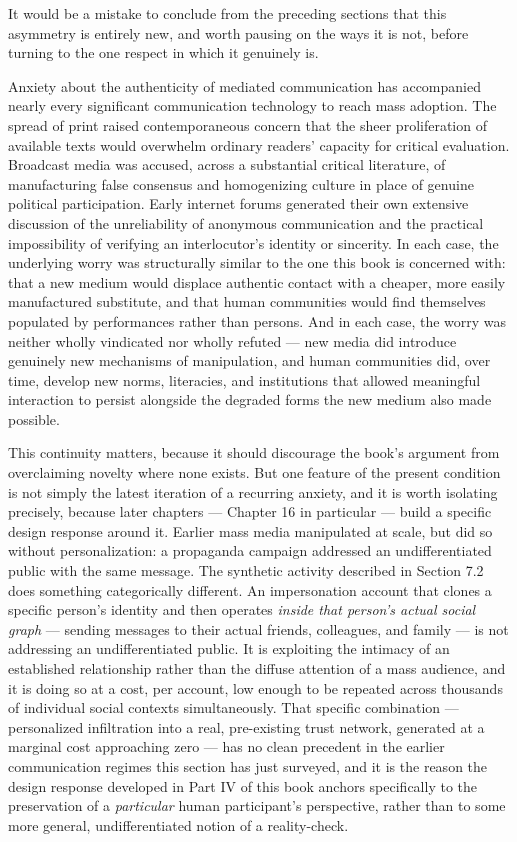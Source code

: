 \documentclass[12pt,a4paper]{book}
\begin{document}
It would be a mistake to conclude from the preceding sections that this asymmetry is entirely new, and worth pausing on the ways it is not, before turning to the one respect in which it genuinely is.

Anxiety about the authenticity of mediated communication has accompanied nearly every significant communication technology to reach mass adoption. The spread of print raised contemporaneous concern that the sheer proliferation of available texts would overwhelm ordinary readers' capacity for critical evaluation. Broadcast media was accused, across a substantial critical literature, of manufacturing false consensus and homogenizing culture in place of genuine political participation. Early internet forums generated their own extensive discussion of the unreliability of anonymous communication and the practical impossibility of verifying an interlocutor's identity or sincerity. In each case, the underlying worry was structurally similar to the one this book is concerned with: that a new medium would displace authentic contact with a cheaper, more easily manufactured substitute, and that human communities would find themselves populated by performances rather than persons. And in each case, the worry was neither wholly vindicated nor wholly refuted — new media did introduce genuinely new mechanisms of manipulation, and human communities did, over time, develop new norms, literacies, and institutions that allowed meaningful interaction to persist alongside the degraded forms the new medium also made possible.

This continuity matters, because it should discourage the book's argument from overclaiming novelty where none exists. But one feature of the present condition is not simply the latest iteration of a recurring anxiety, and it is worth isolating precisely, because later chapters — Chapter 16 in particular — build a specific design response around it. Earlier mass media manipulated at scale, but did so without personalization: a propaganda campaign addressed an undifferentiated public with the same message. The synthetic activity described in Section 7.2 does something categorically different. An impersonation account that clones a specific person's identity and then operates \emph{inside that person's actual social graph} — sending messages to their actual friends, colleagues, and family — is not addressing an undifferentiated public. It is exploiting the intimacy of an established relationship rather than the diffuse attention of a mass audience, and it is doing so at a cost, per account, low enough to be repeated across thousands of individual social contexts simultaneously. That specific combination — personalized infiltration into a real, pre-existing trust network, generated at a marginal cost approaching zero — has no clean precedent in the earlier communication regimes this section has just surveyed, and it is the reason the design response developed in Part IV of this book anchors specifically to the preservation of a \emph{particular} human participant's perspective, rather than to some more general, undifferentiated notion of a reality-check.
\end{document}
